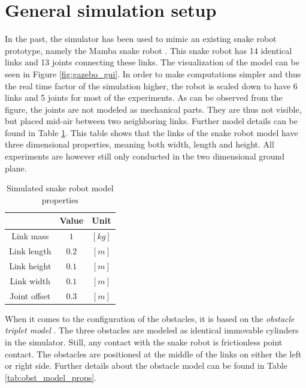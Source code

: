 \section{General simulation setup}\label{sec:simsetup}

In the past, the simulator has been used to mimic an existing snake robot prototype, namely the Mamba snake robot \cite{liljeback2014mamba}. This snake robot has 14 identical links and 13 joints connecting these links. The visualization of the model can be seen in Figure \ref{fig:gazebo_gui}. In order to make computations simpler and thus the real time factor of the simulation higher, the robot is scaled down to have 6 links and 5 joints for most of the experiments. As can be observed from the figure, the joints are not modeled as mechanical parts. They are thus not visible, but placed mid-air between two neighboring links.
Further model details can be found in Table \ref{tab:snake_model_props}. This table shows that the links of the snake robot model have three dimensional properties, meaning both width, length and height. All experiments are however still only conducted in the two dimensional ground plane.

\begin{table}
    \centering
    \begin{tabular}{|c|c|c|}
        \hline
        & Value & Unit\\
        \hline
        Link mass & $1$ & $[kg]$ \\
        Link length & $0.2$ & $[m]$ \\
        Link height & $0.1$ & $[m]$ \\
        Link width & $0.1$ & $[m]$ \\
        Joint offset & $0.3$ & $[m]$\\
        \hline
    \end{tabular}
    \caption{Simulated snake robot model properties}
    \label{tab:snake_model_props}
\end{table}

When it comes to the configuration of the obstacles, it is based on the \textit{obstacle triplet model} \cite{sanfilippo2018snakesim}. The three obstacles are modeled as identical immovable cylinders in the simulator. Still, any contact with the snake robot is frictionless point contact. The obstacles are positioned at the middle of the links on either the left or right side. Further details about the obstacle model can be found in Table \ref{tab:obst_model_props}.

